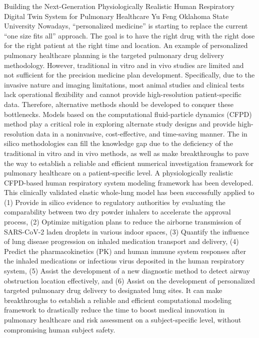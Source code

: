 \begin{addmargin}[2em]{0em}
\vspace{2ex}
\abs
{Building the Next-Generation Physiologically Realistic Human Respiratory Digital Twin System for Pulmonary Healthcare}
{Yu Feng}
{Oklahoma State University}
{Nowadays, ``personalized medicine'' is starting to replace the current ``one size fits all'' approach. The goal is to have the right drug with the right dose for the right patient at the right time and location. An example of personalized pulmonary healthcare planning is the targeted pulmonary drug delivery methodology. However, traditional in vitro and in vivo studies are limited and not sufficient for the precision medicine plan development. Specifically, due to the invasive nature and imaging limitations, most animal studies and clinical tests lack operational flexibility and cannot provide high-resolution patient-specific data. Therefore, alternative methods should be developed to conquer these bottlenecks. Models based on the computational fluid-particle dynamics (CFPD) method play a critical role in exploring alternate study designs and provide high-resolution data in a noninvasive, cost-effective, and time-saving manner. The in silico methodologies can fill the knowledge gap due to the deficiency of the traditional in vitro and in vivo methods, as well as make breakthroughs to pave the way to establish a reliable and efficient numerical investigation framework for pulmonary healthcare on a patient-specific level. A physiologically realistic CFPD-based human respiratory system modeling framework has been developed. This clinically validated elastic whole-lung model has been successfully applied to (1) Provide in silico evidence to regulatory authorities by evaluating the comparability between two dry powder inhalers to accelerate the approval process, (2) Optimize mitigation plans to reduce the airborne transmission of SARS-CoV-2 laden droplets in various indoor spaces, (3) Quantify the influence of lung disease progression on inhaled medication transport and delivery, (4) Predict the pharmacokinetics (PK) and human immune system responses after the inhaled medications or infectious virus deposited in the human respiratory system, (5) Assist the development of a new diagnostic method to detect airway obstruction location effectively, and (6) Assist on the development of personalized targeted pulmonary drug delivery to designated lung sites. It can make breakthroughs to establish a reliable and efficient computational modeling framework to drastically reduce the time to boost medical innovation in pulmonary healthcare and risk assessment on a subject-specific level, without compromising human subject safety.}



\end{addmargin}
